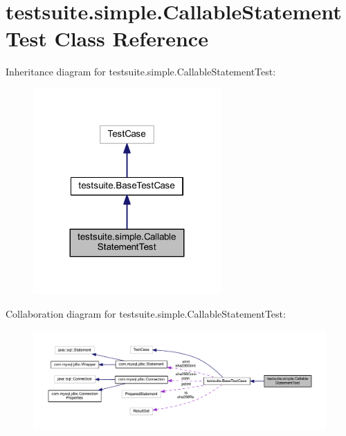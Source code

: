 \hypertarget{classtestsuite_1_1simple_1_1_callable_statement_test}{}\section{testsuite.\+simple.\+Callable\+Statement\+Test Class Reference}
\label{classtestsuite_1_1simple_1_1_callable_statement_test}


Inheritance diagram for testsuite.\+simple.\+Callable\+Statement\+Test\+:
\nopagebreak
\begin{figure}[H]
\begin{center}
\leavevmode
\includegraphics[width=203pt]{classtestsuite_1_1simple_1_1_callable_statement_test__inherit__graph}
\end{center}
\end{figure}


Collaboration diagram for testsuite.\+simple.\+Callable\+Statement\+Test\+:
\nopagebreak
\begin{figure}[H]
\begin{center}
\leavevmode
\includegraphics[width=350pt]{classtestsuite_1_1simple_1_1_callable_statement_test__coll__graph}
\end{center}
\end{figure}
